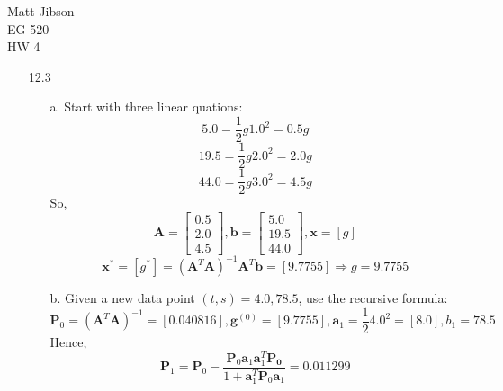\documentclass{article}
\begin{document}
\begin{flushright}
Matt Jibson \\
EG 520 \\
HW 4
\end{flushright}

\begin{itemize}
	\item[12.3]
		\begin{enumerate}
			\item[a.]
				Start with three linear quations:
				\begin{displaymath} 5.0  = \frac{1}{2}g 1.0^2 = 0.5 g \end{displaymath}
				\begin{displaymath} 19.5 = \frac{1}{2}g 2.0^2 = 2.0 g \end{displaymath}
				\begin{displaymath} 44.0 = \frac{1}{2}g 3.0^2 = 4.5 g \end{displaymath}
				So,
				\begin{displaymath}
					\boldsymbol{A} = \left[ \begin{array}{c} 0.5 \\ 2.0 \\ 4.5 \end{array} \right],
					\boldsymbol{b} = \left[ \begin{array}{c} 5.0 \\ 19.5 \\ 44.0 \end{array} \right],
					\boldsymbol{x} = [ g ]
				\end{displaymath}
				\begin{displaymath}
					\boldsymbol{x}^* = [ g^* ] = (\boldsymbol{A}^T \boldsymbol{A})^{-1} \boldsymbol{A}^T \boldsymbol{b} = [ 9.7755 ] \Rightarrow g = 9.7755
				\end{displaymath}
			\item[b.]
				Given a new data point $(t, s) = 4.0, 78.5$, use the recursive formula:
				\begin{displaymath}
					\boldsymbol{P}_0 = (\boldsymbol{A}^T \boldsymbol{A})^{-1} = [ 0.040816 ], \boldsymbol{g}^{(0)} = [ 9.7755 ], \boldsymbol{a}_1 = \frac{1}{2} 4.0^2 = [ 8.0 ], b_1 = 78.5
				\end{displaymath}
				Hence,
				\begin{displaymath}
					\boldsymbol{P}_1 = \boldsymbol{P}_0 - \frac{\boldsymbol{P}_0 \boldsymbol{a}_1 \boldsymbol{a}_1^T \boldsymbol{P_0}}{1 + \boldsymbol{a}_1^T \boldsymbol{P}_0 \boldsymbol{a}_1} = 0.011299

\end{displaymath}
\end{enumerate}
\end{itemize}
\end{document}
